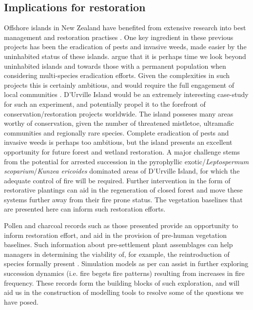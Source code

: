 \documentclass{article}
\begin{document}
\subsection{Implications for restoration}

Offshore islands in New Zealand have benefited from extensive research into best management and restoration practises  \citep[e.g.][]{simberloff2002today,towns2003small,parker2008translocation,towns2013purposes,buxton2014drivers,russell2016fifty}.  One key ingredient in these previous projects has been the eradication of pests and invasive weeds, made easier by the uninhabited status of these islands.  \cite{glen2013eradicating} argue that it is perhaps time we look beyond uninhabited islands and towards those with a permanent population when considering multi-species eradication efforts.  Given the complexities in such projects this is certainly ambitious, and would require the full engagement of local communities \citep{Ogden2009}.  D'Urville Island would be an extremely interesting case-study for such an experiment, and potentially propel it to the forefront of conservation/restoration projects worldwide.  The island posseses many areas worthy of conservation, given the number of threatened mistletoe, ultramafic communities and regionally rare species.  Complete eradication of pests and invasive weeds is perhaps too ambitious, but the island presents an excellent opportunity for future forest and wetland restoration. A major challenge stems from the potential for arrested succession in the pyrophyllic exotic/\textit{Leptospermum scoparium}/\textit{Kunzea ericoides} dominated areas of D'Urville Island, for which the adequate control of fire will be required. Further intervention in the form of restorative plantings can aid in the regeneration of closed forest and move these systems further away from their fire prone status.  The vegetation baselines that are presented here can inform such restoration efforts.   

Pollen and charcoal records such as those presented provide an opportunity to inform restoration effort, and aid in the provision of pre-human vegetation baselines. Such information about pre-settlement plant assemblages can help managers in determining the viability of, for example, the reintroduction of species formally present \citep{Wilmshurst2014}. Simulation models as per \cite{Perry2016} can assist in further exploring succession dynamics (i.e. fire begets fire patterns) resulting from increases in fire frequency. These records form the building blocks of such exploration, and will aid us in the construction of modelling tools to resolve some of the questions we have posed.    



\end{document}
